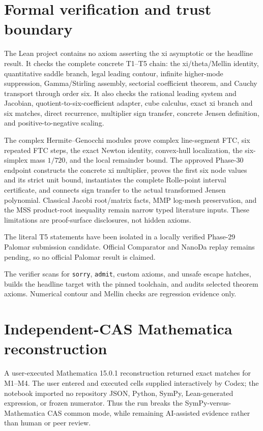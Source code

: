 \documentclass[11pt]{article}
\theoremstyle{definition}
\theoremstyle{remark}
\begin{document}
\section{Formal verification and trust boundary}\label{sec:formal}

The Lean project contains no axiom asserting the xi asymptotic or the headline
result.  It checks the complete concrete T1--T5 chain: the xi/theta/Mellin
identity, quantitative saddle branch, legal leading contour, infinite
higher-mode suppression, Gamma/Stirling assembly, sectorial coefficient
theorem, and Cauchy transport through order six.  It also checks the rational
leading system and Jacobian, quotient-to-six-coefficient adapter, cube
calculus, exact xi branch and six matches, direct recurrence, multiplier sign
transfer, concrete Jensen definition, and positive-to-negative scaling.

The complex Hermite--Genocchi modules prove complex line-segment FTC, six
repeated FTC steps, the exact Newton identity, convex-hull localization, the
six-simplex mass $1/720$, and the local remainder bound.  The approved
Phase-30 endpoint constructs the concrete xi multiplier, proves the first six
node values and its strict unit bound, instantiates the complete
Rolle-point interval certificate, and connects sign transfer to the actual
transformed Jensen polynomial.  Classical Jacobi root/matrix facts, MMP
log-mesh preservation, and the MSS product-root inequality remain narrow
typed literature inputs.  These limitations are proof-surface disclosures,
not hidden axioms.

The literal T5 statements have been isolated in a locally verified Phase-29
Palomar submission candidate.  Official Comparator and NanoDa replay remains
pending, so no official Palomar result is claimed.

The verifier scans for \texttt{sorry}, \texttt{admit}, custom axioms, and
unsafe escape hatches, builds the headline target with the pinned toolchain,
and audits selected theorem axioms.  Numerical contour and Mellin checks are
regression evidence only.

\section{Independent-CAS Mathematica reconstruction}\label{sec:mathematica}

A user-executed Mathematica 15.0.1 reconstruction returned exact matches for
M1--M4.  The user entered and executed cells supplied interactively by Codex;
the notebook imported no repository JSON, Python, SymPy, Lean-generated
expression, or frozen numerator.  Thus the run breaks the
SymPy-versus-Mathematica CAS common mode, while remaining AI-assisted evidence
rather than human or peer review.
\end{document}
